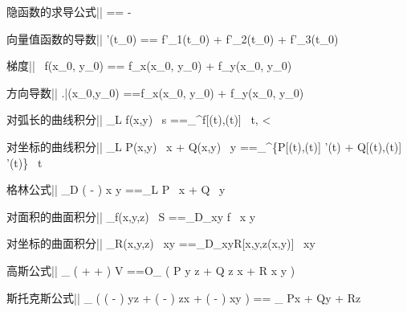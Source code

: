 





隐函数的求导公式||
== -


向量值函数的导数||
'(t_0)
== f'_1(t_0) + f'_2(t_0) + f'_3(t_0)


梯度||
 \, f(x_0, y_0)
== f_x(x_0, y_0) + f_y(x_0, y_0)


方向导数||
\left.\right|{(x_0,y_0)}
==f_x(x_0, y_0) \cos\alpha + f_y(x_0, y_0) \cos\beta


对弧长的曲线积分||
\int_L f(x,y) \, s
==\int_\alpha^\beta f[\phi(t),\psi(t)]  \, t, \quad \alpha < \beta


对坐标的曲线积分||
\int_L P(x,y) \, x + Q(x,y) \, y
==\int_\alpha^\beta \left\{P[\phi(t),\psi(t)] \phi'(t) + Q[\phi(t),\psi(t)] \psi'(t)\right\} \, t

格林公式||
\iint_D \left( - \right) x y
==\oint_L P \, x + Q \, y

对面积的曲面积分||
\iint_\Sigma f(x,y,z) \, S
==\iint_{D_{xy}} f\big[x,y,z(x,y)\big]  \, x y

对坐标的曲面积分||
\iint_\Sigma R(x,y,z) \, xy
==\iint_{D_{xy}}R[x,y,z(x,y)] \, xy

高斯公式||
\iiint_{\Omega} \left(  +  +  \right) V
==O\iint_{\Sigma} \left( P y z + Q z x + R x y \right)

斯托克斯公式||
\iint_{\Sigma} \left(
  \left( - \right) yz +
  \left( - \right) zx +
  \left( - \right) xy
\right) == \oint_{\partial \Sigma} Px + Qy + Rz

